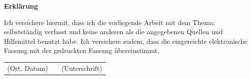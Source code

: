 \clearpage

\thispagestyle{empty}

{\LARGE\textsf{\textbf{Erklärung}}\bigskip}

%
Ich versichere hiermit, dass ich die vorliegende Arbeit mit dem Thema: \emph{\themaMeinerArbeit} selbstständig verfasst und keine anderen als die angegebenen Quellen und Hilfsmittel benutzt habe.
Ich versichere zudem, dass die eingereichte elektronische Fassung mit der gedruckten Fassung übereinstimmt.%


\vspace{3cm}

\begin{center}
\begin{tabular}{ccc}
(Ort, Datum) & \hspace{0.3\linewidth} & (Unterschrift)
\end{tabular}
\end{center}


